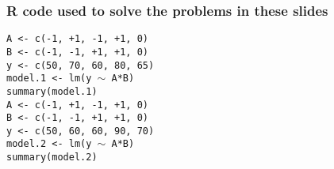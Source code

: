 \begin{frame}\frametitle{R code used to solve the problems in these slides}
	\texttt{A <- c(-1,  +1,  -1,  +1,   0)}\\
	\texttt{B <- c(-1,  -1,  +1,  +1,   0)}\\
	\texttt{y <- c(50, 70, 60, 80, 65)}\\
	\texttt{model.1 <- lm(y $\sim$ A*B)} \\
	\texttt{summary(model.1)}\\
	
	\vspace{24pt}
	\texttt{A <- c(-1,  +1,  -1,  +1,   0)}\\
	\texttt{B <- c(-1,  -1,  +1,  +1,   0)}\\
	\texttt{y <- c(50, 60, 60, 90, 70)}\\
	\texttt{model.2 <- lm(y $\sim$ A*B)}\\
	\texttt{summary(model.2)}
	
\end{frame}

